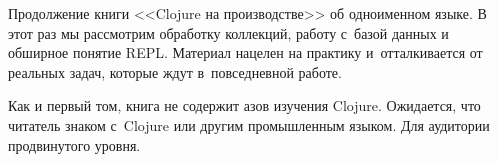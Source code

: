 \thispagestyle{empty}

Продолжение книги <<Clojure на производстве>> об одноименном языке. В этот раз
мы рассмотрим обработку коллекций, работу с~базой данных и обширное понятие
REPL. Материал нацелен на практику и~отталкивается от реальных задач, которые
ждут в~повседневной работе.

Как и первый том, книга не содержит азов изучения Clojure. Ожидается, что
читатель знаком с~Clojure или другим промышленным языком. Для аудитории
продвинутого уровня.
